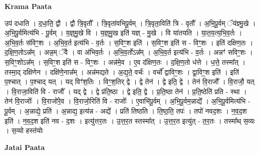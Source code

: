 \documentclass[17pt]{extarticle}
\begin{document}
\textbf{Krama Paata} \newline

उप॑ दधाति । द॒धा॒ति॒ द्वौ । द्वौ त्रि॒वृतौ᳚ । त्रि॒वृता॑वभिपू॒र्वम् । त्रि॒वृता॒विति॑ त्रि - वृतौ᳚ । अ॒भि॒पू॒र्वम् ॅय॑ज्ञ्मु॒खे । अ॒भि॒पू॒र्वमित्य॑भि - पू॒र्वम् । य॒ज्ञ्॒मु॒खे वि । य॒ज्ञ्॒मु॒ख इति॑ यज्ञ् - मु॒खे । वि या॑तयति । या॒त॒य॒त्य॒भि॒व॒र्तः । अ॒भि॒व॒र्तः स॑विꣳ॒॒शः । अ॒भि॒व॒र्त इत्य॑भि - व॒र्तः । स॒विꣳ॒॒श इति॑ । स॒विꣳ॒॒श इति॑ स - विꣳ॒॒शः । इति॑ दक्षिण॒तः । द॒क्षि॒ण॒तोऽन्न᳚म् । अन्न॒म् ॅवै । वा अ॑भिव॒र्तः । अ॒भि॒व॒र्तोऽन्न᳚म् । अ॒भि॒व॒र्त इत्य॑भि - व॒र्तः । अन्नꣳ॑ सविꣳ॒॒शः । स॒विꣳ॒॒शोऽन्न᳚म् । स॒विꣳ॒॒श इति॑ स - विꣳ॒॒शः । अन्न॑मे॒व । ए॒व द॑क्षिण॒तः । द॒क्षि॒ण॒तो ध॑त्ते । ध॒त्ते॒ तस्मा᳚त् । तस्मा॒द् दक्षि॑णेन । दक्षि॑णे॒नान्न᳚म् । अन्न॑मद्यते । अ॒द्य॒ते॒ वर्चः॑ । वर्चो᳚ द्वाविꣳ॒॒शः । द्वा॒विꣳ॒॒श इति॑ । इति॑ प॒श्चात् । प॒श्चाद् यत् । यद् विꣳ॑श॒तिः । विꣳ॒॒श॒तिर् द्वे । द्वे तेन॑ । द्वे इति॒ द्वे । तेन॑ वि॒राजौ᳚ । वि॒राजौ॒ यत् । वि॒राजा॒विति॑ वि - राजौ᳚ । यद् द्वे । द्वे प्र॑ति॒ष्ठा । द्वे इति॒ द्वे । प्र॒ति॒ष्ठा तेन॑ । प्र॒ति॒ष्ठेति॑ प्रति - स्था । तेन॑ वि॒राजोः᳚ । वि॒राजो॑रे॒व । वि॒राजो॒रिति॑ वि - राजोः᳚ । ए॒वाभि॑पू॒र्वम् । अ॒भि॒पू॒र्वम॒न्नाद्ये᳚ । अ॒भि॒पू॒र्वमित्य॑भि - पू॒र्वम् । अ॒न्नाद्ये॒ प्रति॑ । अ॒न्नाद्य॒ इत्य॑न्न - अद्ये᳚ । प्रति॑ तिष्ठति । ति॒ष्ठ॒ति॒ तपः॑ । तपो॑ नवद॒शः । न॒व॒द॒श इति॑ । न॒व॒द॒श इति॑ नव - द॒शः । इत्यु॑त्तर॒तः । उ॒त्त॒र॒त स्तस्मा᳚त् । उ॒त्त॒र॒त इत्यु॑त् - त॒र॒तः । तस्मा᳚थ् स॒व्यः । स॒व्यो हस्त॑योः \newline

\textbf{Jatai Paata} \newline
\end{document}
